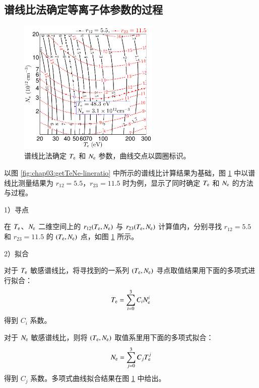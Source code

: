 \subsection{谱线比法确定等离子体参数的过程}

\begin{figure}
  \centering
  \includegraphics[width=0.6\textwidth]{5-9to7-7to5-getTeNe-crosspoint.pdf}
  \caption{谱线比法确定 $T_{\rm e}$ 和 $N_{\rm e}$ 参数，曲线交点以圆圈标识。}
  \label{fig:chap03:getTeNe-cross-pnt}
\end{figure}

以图 \ref{fig:chap03:getTeNe-lineratio} 中所示的谱线比计算结果为基础，图 \ref{fig:chap03:getTeNe-cross-pnt} 中以谱线比测量结果为 $r_{12}=5.5$，$r_{23}=11.5$ 时为例，显示了同时确定 $T_{\rm e}$ 和 $N_{\rm e}$ 的方法与过程。

1）寻点

在 $T_{\rm e}$、$N_{\rm e}$ 二维空间上的 $r_{12}(T_{\rm e},N_{\rm e})$ 与 $r_{23}(T_{\rm e},N_{\rm e})$ 计算值内，分别寻找 $r_{12}=5.5$ 和 $r_{23}=11.5$ 的 $(T_{\rm e}, N_{\rm e})$ 点，如图 \ref{fig:chap03:getTeNe-cross-pnt} 所示。

2）拟合

对于 $T_{\rm e}$ 敏感谱线比，将寻找到的一系列 $(T_{\rm e}, N_{\rm e})$ 寻点取值结果用下面的多项式进行拟合：
\begin{equation}
    \label{eq:chap03:getTeNe:r12-fit}
    T_{\rm e} = \sum_{i=0}^{3}C_{i}N_{\rm e}^{i}
\end{equation}
得到 $C_i$ 系数。

对于 $N_{\rm e}$ 敏感谱线比，则将 $(T_{\rm e}, N_{\rm e})$ 取值系里用下面的多项式拟合：
\begin{equation}
    \label{eq:chap03:getTeNe:r32-fit}
    N_{\rm e} = \sum_{j=0}^{3}C_{j}T_{\rm e}^{j}
\end{equation}
得到 $C_j$ 系数。多项式曲线拟合结果在图 \ref{fig:chap03:getTeNe-cross-pnt} 中给出。

